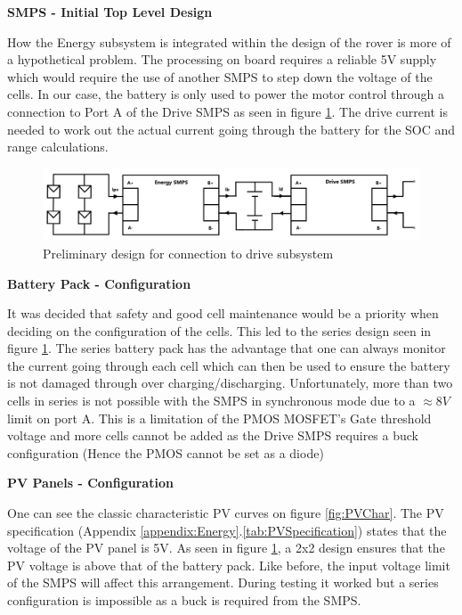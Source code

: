 \documentclass[10pt,twoside]{article}
\begin{document}
\textbf{SMPS - Initial Top Level Design}

How the Energy subsystem is integrated within the design of the rover is more of a hypothetical problem. The processing on board requires a reliable 5V supply which would require the use of another SMPS to step down the voltage of the cells. In our case, the battery is only used to power the motor control through a connection to Port A of the Drive SMPS as seen in figure \ref{fig:InitalDesign}. The drive current is needed to work out the actual current going through the battery for the SOC and range calculations.

\begin{figure}[hbt]
\includegraphics[scale = 0.55]{SMPS}
\centering
\caption{Preliminary design for connection to drive subsystem}
\label{fig:InitalDesign}
\end{figure}

\textbf{Battery Pack - Configuration}

It was decided that safety and good cell maintenance would be a priority when deciding on the configuration of the cells. This led to the series design seen in figure \ref{fig:InitalDesign}. The series battery pack has the advantage that one can always monitor the current going through each cell which can then be used to ensure the battery is not damaged through over charging/discharging. Unfortunately, more than two cells in series is not possible with the SMPS in synchronous mode due to a $\approx 8V$ limit on port A. This is a limitation of the PMOS MOSFET's Gate threshold voltage and more cells cannot be added as the Drive SMPS requires a buck configuration (Hence the PMOS cannot be set as a diode) 

\textbf{PV Panels - Configuration}

One can see the classic characteristic PV curves on figure \ref{fig:PVChar}. The PV specification (Appendix \ref{appendix:Energy}.\ref{tab:PVSpecification}) states that the voltage of the PV panel is 5V. As seen in figure \ref{fig:InitalDesign}, a 2x2 design ensures that the PV voltage is above that of the battery pack. Like before, the input voltage limit of the SMPS will affect this arrangement. During testing it worked but a series configuration is impossible as a buck is required from the SMPS.
\end{document}
